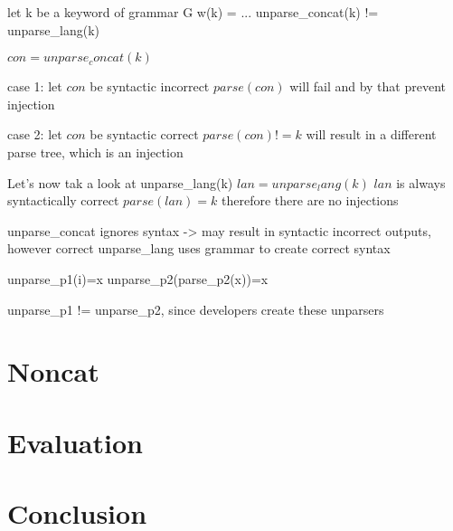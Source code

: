\documentclass[conference]{IEEEtran}
\newcommand{\punchline}[1]{\textbf{Punch line: #1}}
\renewcommand{\punchline}[1]{}
\begin{document}
\punchline{definition shotgun unparser}
let k be a keyword of grammar G
w(k) = ...
unparse_concat(k) != unparse_lang(k)

$con=unparse_concat(k)$

case 1: let $con$ be syntactic incorrect
$parse(con)$ will fail and by that prevent injection

case 2: let $con$ be syntactic correct
$parse(con) != k$ will result in a different parse tree, which is an injection


Let's now tak a look at unparse_lang(k)
$lan = unparse_lang(k)$
$lan$ is always syntactically correct
$parse(lan) = k$ therefore there are no injections

unparse_concat ignores syntax -> may result in syntactic incorrect outputs, however correct 
unparse_lang uses grammar to create correct syntax

unparse_p1(i)=x
unparse_p2(parse_p2(x))=x


unparse_p1 != unparse_p2, since developers create these unparsers

\section{Noncat}\label{sec:mchc}


\section{Evaluation}
\section{Conclusion} \label{sec:conclusion}




\end{document}
